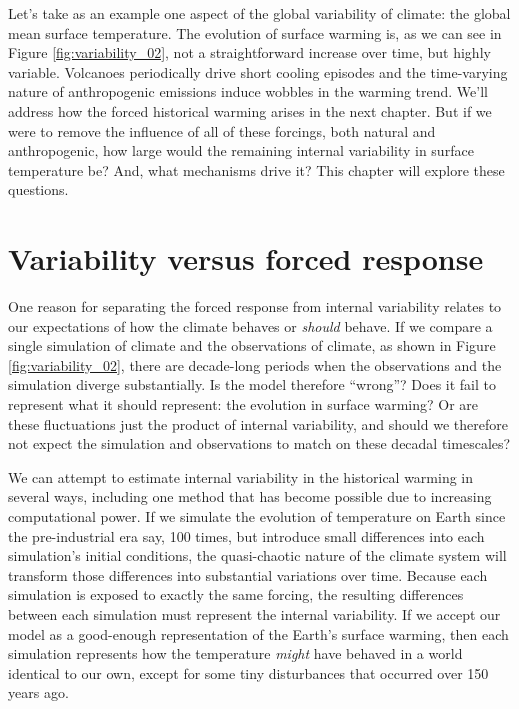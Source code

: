 \documentclass[12pt]{book}
\begin{document}
Let's take as an example one aspect of the global variability of climate: the global mean surface temperature. The evolution of surface warming is, as we can see in Figure \ref{fig:variability_02}, not a straightforward increase over time, but highly variable. Volcanoes periodically drive short cooling episodes and the time-varying nature of anthropogenic emissions induce wobbles in the warming trend. We'll address how the forced historical warming arises in the next chapter. But if we were to remove the influence of all of these forcings, both natural and anthropogenic, how large would the remaining internal variability in surface temperature be? And, what mechanisms drive it? This chapter will explore these questions.

\section{Variability versus forced response}
\label{sec:varvsforced}
One reason for separating the forced response from internal variability relates to our expectations of how the climate behaves or \textit{should} behave. If we compare a single simulation of climate and the observations of climate, as shown in Figure \ref{fig:variability_02}, there are decade-long periods when the observations and the simulation diverge substantially. Is the model therefore ``wrong''? Does it fail to represent what it should represent: the evolution in surface warming? Or are these fluctuations just the product of internal variability, and should we therefore not expect the simulation and observations to match on these decadal timescales?

We can attempt to estimate internal variability in the historical warming in several ways, including one method that has become possible due to increasing computational power. If we simulate the evolution of temperature on Earth since the pre-industrial era say, 100 times, but introduce small differences into each simulation's initial conditions, the quasi-chaotic nature of the climate system will transform those differences into substantial variations over time. Because each simulation is exposed to exactly the same forcing, the resulting differences between each simulation must represent the internal variability. If we accept our model as a good-enough representation of the Earth's surface warming, then each simulation represents how the temperature \textit{might} have behaved in a world identical to our own, except for some tiny disturbances that occurred over 150 years ago.
\end{document}
